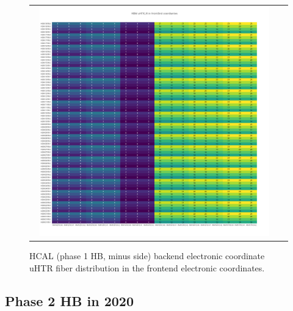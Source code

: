 \begin{figure}[htb]
 \begin{center}
  \begin{tabular}{cc}
   \includegraphics[angle=0,width=0.95\textwidth]{figures/appendix/HBM_uHTR_FI_in_FrontEnd.png}
  \end{tabular}
  \caption{HCAL (phase 1 HB, minus side) backend electronic coordinate uHTR fiber distribution in the frontend electronic coordinates.}
  \label{fig:lmapHBMuHTRFIFEC}
 \end{center}
\end{figure}
\clearpage

\subsection{Phase 2 HB in 2020}
\clearpage

